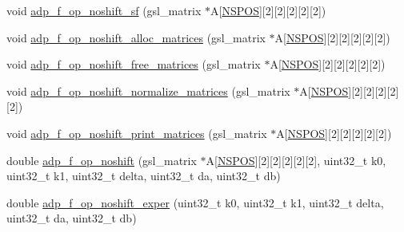 \begin{DoxyCompactItemize}
\item 
void \hyperlink{adp-tea-f-fk-noshift_8cc_a23de342298e8c480df8c8ba3b7125edf}{adp\-\_\-f\-\_\-op\-\_\-noshift\-\_\-sf} (gsl\-\_\-matrix $\ast$\-A\mbox{[}\hyperlink{adp-tea-f-fk-noshift_8hh_a4822a46657916694abfee9a1c1cdd137}{\-N\-S\-P\-O\-S}\mbox{]}\mbox{[}2\mbox{]}\mbox{[}2\mbox{]}\mbox{[}2\mbox{]}\mbox{[}2\mbox{]}\mbox{[}2\mbox{]})
\item 
void \hyperlink{adp-tea-f-fk-noshift_8cc_ac0b220b9e12d3deba6975d306ee0abc3}{adp\-\_\-f\-\_\-op\-\_\-noshift\-\_\-alloc\-\_\-matrices} (gsl\-\_\-matrix $\ast$\-A\mbox{[}\hyperlink{adp-tea-f-fk-noshift_8hh_a4822a46657916694abfee9a1c1cdd137}{\-N\-S\-P\-O\-S}\mbox{]}\mbox{[}2\mbox{]}\mbox{[}2\mbox{]}\mbox{[}2\mbox{]}\mbox{[}2\mbox{]}\mbox{[}2\mbox{]})
\item 
void \hyperlink{adp-tea-f-fk-noshift_8cc_a98db145f973752af2ab7143077141e54}{adp\-\_\-f\-\_\-op\-\_\-noshift\-\_\-free\-\_\-matrices} (gsl\-\_\-matrix $\ast$\-A\mbox{[}\hyperlink{adp-tea-f-fk-noshift_8hh_a4822a46657916694abfee9a1c1cdd137}{\-N\-S\-P\-O\-S}\mbox{]}\mbox{[}2\mbox{]}\mbox{[}2\mbox{]}\mbox{[}2\mbox{]}\mbox{[}2\mbox{]}\mbox{[}2\mbox{]})
\item 
void \hyperlink{adp-tea-f-fk-noshift_8cc_a60908ea41ae7cbeafb475c09623d5f0f}{adp\-\_\-f\-\_\-op\-\_\-noshift\-\_\-normalize\-\_\-matrices} (gsl\-\_\-matrix $\ast$\-A\mbox{[}\hyperlink{adp-tea-f-fk-noshift_8hh_a4822a46657916694abfee9a1c1cdd137}{\-N\-S\-P\-O\-S}\mbox{]}\mbox{[}2\mbox{]}\mbox{[}2\mbox{]}\mbox{[}2\mbox{]}\mbox{[}2\mbox{]}\mbox{[}2\mbox{]})
\item 
void \hyperlink{adp-tea-f-fk-noshift_8cc_ad426ae37e100f13ab3fe95d7f6254ba0}{adp\-\_\-f\-\_\-op\-\_\-noshift\-\_\-print\-\_\-matrices} (gsl\-\_\-matrix $\ast$\-A\mbox{[}\hyperlink{adp-tea-f-fk-noshift_8hh_a4822a46657916694abfee9a1c1cdd137}{\-N\-S\-P\-O\-S}\mbox{]}\mbox{[}2\mbox{]}\mbox{[}2\mbox{]}\mbox{[}2\mbox{]}\mbox{[}2\mbox{]}\mbox{[}2\mbox{]})
\item 
double \hyperlink{adp-tea-f-fk-noshift_8cc_adae0e9b5832d3b61a0c626b547441349}{adp\-\_\-f\-\_\-op\-\_\-noshift} (gsl\-\_\-matrix $\ast$\-A\mbox{[}\hyperlink{adp-tea-f-fk-noshift_8hh_a4822a46657916694abfee9a1c1cdd137}{\-N\-S\-P\-O\-S}\mbox{]}\mbox{[}2\mbox{]}\mbox{[}2\mbox{]}\mbox{[}2\mbox{]}\mbox{[}2\mbox{]}\mbox{[}2\mbox{]}, uint32\-\_\-t k0, uint32\-\_\-t k1, uint32\-\_\-t delta, uint32\-\_\-t da, uint32\-\_\-t db)
\item 
double \hyperlink{adp-tea-f-fk-noshift_8cc_a1eda076dbcc18021d891ac9f0532d50f}{adp\-\_\-f\-\_\-op\-\_\-noshift\-\_\-exper} (uint32\-\_\-t k0, uint32\-\_\-t k1, uint32\-\_\-t delta, uint32\-\_\-t da, uint32\-\_\-t db)
\end{DoxyCompactItemize}


